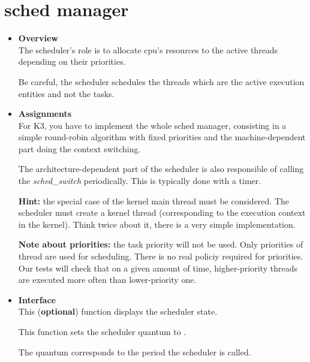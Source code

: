 %
%

\newpage

\section{\textbf{sched} manager}
\begin{itemize}
  \item {\bf Overview}\\

    The scheduler's role is to allocate cpu's resources to the
    active threads depending on their priorities.

    Be careful, the scheduler schedules the threads which are the active
    execution entities and not the tasks.

  \item {\bf Assignments}\\

    For K3, you have to implement the whole sched manager, consisting
    in a simple round-robin algorithm with fixed priorities and the
    machine-dependent part doing the context switching.

    The architecture-dependent part of the scheduler is also
    responsible of calling the \emph{sched\_switch} periodically. This
    is typically done with a timer.

    \textbf{Hint:} the special case of the kernel main thread must be
    considered. The scheduler must create a kernel thread
    (corresponding to the execution context in the kernel). Think
    twice about it, there is a very simple implementation.

    \textbf{Note about priorities:} the task priority will not be
    used. Only priorities of thread are used for scheduling. There is
    no real policiy required for priorities. Our tests will check that
    on a given amount of time, higher-priority threads are executed
    more often than lower-priority one.

  \item {\bf Interface}\\

	 {
	   This (\textbf{optional}) function displays the scheduler state.
	 }

	 {
	   This function sets the scheduler quantum to .

	   The quantum corresponds to the period the scheduler is called.
	 }


\end{itemize}
